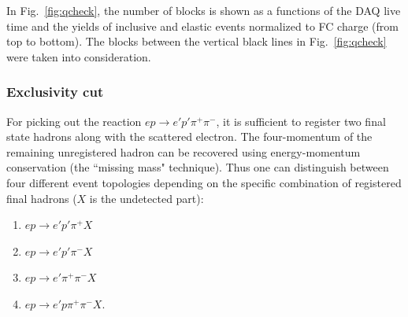 \documentclass[prc,twocolumn,superscriptaddress,showpacs,amssymb,amsmath,amsfonts,aps,nofootinbib]{revtex4-1}
\begin{document}
In Fig.~\ref{fig:qcheck}, the number of blocks is shown as a functions of the DAQ live time and  the yields of inclusive and elastic events normalized to FC charge (from top to bottom). 
The blocks between the vertical black  lines in Fig.~\ref{fig:qcheck} were taken into consideration.






\subsubsection{Exclusivity cut}



For picking out the reaction $e p \rightarrow e' p' \pi^{+} \pi^{-} $, it is sufficient to register two final state hadrons along with the scattered electron. The four-momentum of the remaining unregistered hadron can be recovered using energy-momentum conservation (the ``missing mass" technique). Thus one can distinguish between four different event topologies depending on the specific combination of registered final hadrons ($X$ is the undetected part): 

\begin{enumerate}
\item $e p \rightarrow e' p' \pi^{+} X$\text{,}
\item $e p \rightarrow e' p' \pi^{-} X$\text{,}
\item $e p \rightarrow e' \pi^{+} \pi^{-} X$
\item $e p \rightarrow e' p \pi^{+} \pi^{-} X$.
\end{enumerate}
\end{document}
